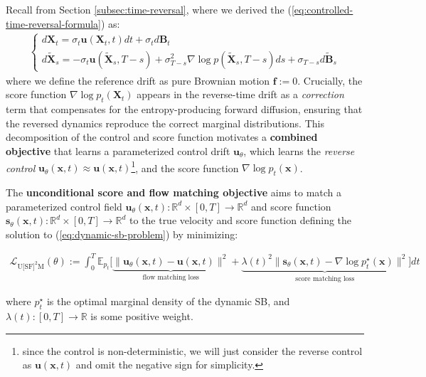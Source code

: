 \documentclass{article}
\begin{document}
Recall from Section \ref{subsec:time-reversal}, where we derived the (\ref{eq:controlled-time-reversal-formula}) as:
\begin{align}
\begin{cases}
        d\boldsymbol{X}_t=\sigma_t\boldsymbol{u}(\boldsymbol{X}_t,t)dt+\sigma_td\boldsymbol{B}_t\\
        d\tilde{\boldsymbol{X}}_s=-\sigma_t\boldsymbol{u}(\tilde{\boldsymbol{X}}_s,T-s)+\sigma_{T-s}^2\nabla\log p(\tilde{\boldsymbol{X}}_s,T-s)ds+\sigma_{T-s}d\widetilde{\boldsymbol{B}}_s
    \end{cases}
\end{align}
where we define the reference drift as pure Brownian motion $\boldsymbol{f}:=0$. Crucially, the score function $\nabla \log p_t(\boldsymbol{X}_t)$ appears in the reverse-time drift as a \textit{correction} term that compensates for the entropy-producing forward diffusion, ensuring that the reversed dynamics reproduce the correct marginal distributions. This decomposition of the control and score function motivates a \textbf{combined objective} that learns a parameterized control drift $\boldsymbol{u}_\theta$, which learns the \textit{reverse control} $\boldsymbol{u}_\theta(\boldsymbol{x},t)\approx\boldsymbol{u}(\boldsymbol{x},t)$\footnote{since the control is non-deterministic, we will just consider the reverse control as $\boldsymbol{u}(\boldsymbol{x},t)$ and omit the negative sign for simplicity.},  and the score function $\nabla \log p_t(\boldsymbol{x})$.

\begin{definition}\label{def:uncond-score-flow}
    The \textbf{unconditional score and flow matching objective} aims to match a parameterized control field $\boldsymbol{u}_\theta(\boldsymbol{x},t):\mathbb{R}^d\times[0,T] \to \mathbb{R}^d$ and score function $\boldsymbol{s}_\theta(\boldsymbol{x},t):\mathbb{R}^d\times[0,T]\to \mathbb{R}^d$ to the true velocity and score function defining the solution to (\ref{eq:dynamic-sb-problem}) by minimizing:
    \begin{small}
    \begin{align}
        \mathcal{L}_{\text{U[SF]}^2\text{M}}(\theta):=\int_0^T\mathbb{E}_{p_t}\bigg[\underbrace{\|\boldsymbol{u}_\theta(\boldsymbol{x},t)-\boldsymbol{u}(\boldsymbol{x},t)\|^2}_{\text{flow matching loss}}+\underbrace{\lambda(t)^2\|\boldsymbol{s}_\theta(\boldsymbol{x},t)-\nabla \log p^\star_t(\boldsymbol{x})\|^2}_{\text{score matching loss}}\bigg]dt \tag{Unconditional Objective}\label{eq:uncond-score-flow}
    \end{align}
    \end{small}
    where $p^\star_t$ is the optimal marginal density of the dynamic SB, and $\lambda(t):[0,T] \to \mathbb{R}$ is some positive weight.
\end{definition}
\end{document}
